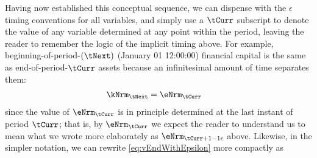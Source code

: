 \documentclass[./SolvingMicroDSOPs]{subfiles}
\begin{document}

Having now established this conceptual sequence, we can dispense with the $\epsilon$ timing conventions for all variables, and simply use a $\tCurr$ subscript to denote the value of any variable determined at any point within the period, leaving the reader to remember the logic of the implicit timing above.  For example, beginning-of-period-$(\tNext)$ (January 01 12:00:00) financial capital is the same as end-of-period-$\tCurr$ assets because an infinitesimal amount of time separates them:
\begin{align}
  \kNrm_{\tNext} & = \eNrm_{\tCurr}
\end{align}
since the value of $\eNrm_{\tCurr}$ is in principle determined at the last instant of period $\tCurr$; that is, by $\eNrm_{\tCurr}$ we expect the reader to understand us to mean what we wrote more elaborately as $\eNrm_{\tCurr+1-\calculatee}$ above.  Likewise, in the simpler notation, we can rewrite \eqref{eq:vEndWithEpsilon} more compactly as
\end{document}

